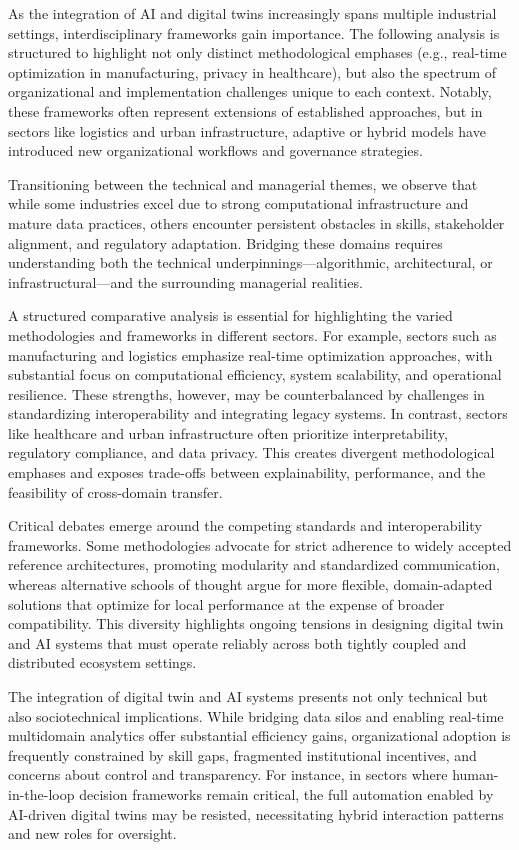 \documentclass[sigconf]{acmart}
\begin{document}
As the integration of AI and digital twins increasingly spans multiple industrial settings, interdisciplinary frameworks gain importance. The following analysis is structured to highlight not only distinct methodological emphases (e.g., real-time optimization in manufacturing, privacy in healthcare), but also the spectrum of organizational and implementation challenges unique to each context. Notably, these frameworks often represent extensions of established approaches, but in sectors like logistics and urban infrastructure, adaptive or hybrid models have introduced new organizational workflows and governance strategies.

Transitioning between the technical and managerial themes, we observe that while some industries excel due to strong computational infrastructure and mature data practices, others encounter persistent obstacles in skills, stakeholder alignment, and regulatory adaptation. Bridging these domains requires understanding both the technical underpinnings—algorithmic, architectural, or infrastructural—and the surrounding managerial realities.

A structured comparative analysis is essential for highlighting the varied methodologies and frameworks in different sectors. For example, sectors such as manufacturing and logistics emphasize real-time optimization approaches, with substantial focus on computational efficiency, system scalability, and operational resilience. These strengths, however, may be counterbalanced by challenges in standardizing interoperability and integrating legacy systems. In contrast, sectors like healthcare and urban infrastructure often prioritize interpretability, regulatory compliance, and data privacy. This creates divergent methodological emphases and exposes trade-offs between explainability, performance, and the feasibility of cross-domain transfer.

Critical debates emerge around the competing standards and interoperability frameworks. Some methodologies advocate for strict adherence to widely accepted reference architectures, promoting modularity and standardized communication, whereas alternative schools of thought argue for more flexible, domain-adapted solutions that optimize for local performance at the expense of broader compatibility. This diversity highlights ongoing tensions in designing digital twin and AI systems that must operate reliably across both tightly coupled and distributed ecosystem settings.

The integration of digital twin and AI systems presents not only technical but also sociotechnical implications. While bridging data silos and enabling real-time multidomain analytics offer substantial efficiency gains, organizational adoption is frequently constrained by skill gaps, fragmented institutional incentives, and concerns about control and transparency. For instance, in sectors where human-in-the-loop decision frameworks remain critical, the full automation enabled by AI-driven digital twins may be resisted, necessitating hybrid interaction patterns and new roles for oversight.
\end{document}
